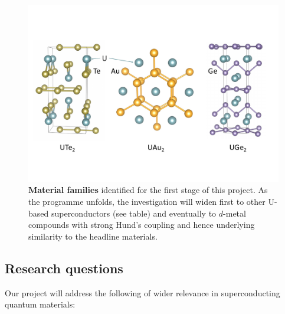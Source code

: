 \begin{figure}[t]
  \centerline{\includegraphics[width=\columnwidth]{Figures/Structures.pdf}}
  
     \caption{{\bf Material families} identified for the first stage of this project. As the programme unfolds, the investigation will widen first to other U-based superconductors (see table) and eventually to $d$-metal compounds with strong Hund's coupling and hence underlying similarity to the headline materials. }
     
      \label{fig:Materials}
  \end{figure}
  
  
  \subsection*{Research questions}
  \noindent
  Our project will address the following  of wider relevance in superconducting quantum materials:
  
  
